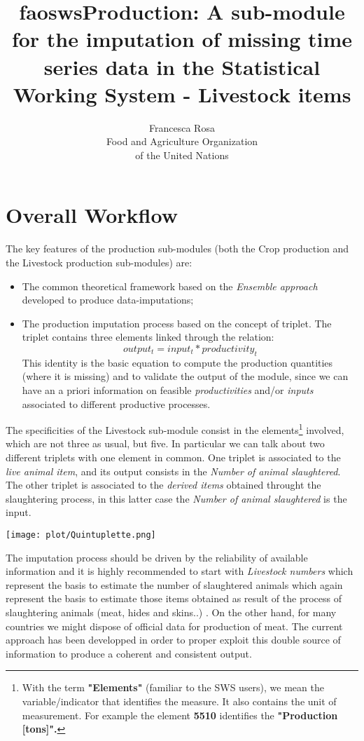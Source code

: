 \documentclass[nojss]{jss}
\title{\bf faoswsProduction: A sub-module for the imputation of missing time
series data in the Statistical Working System - Livestock items }
\author{Francesca Rosa\\ Food and Agriculture
    Organization \\ of the United Nations\\}
\begin{document}

\SwaveParseOpstions


\section{Overall Workflow}

The key features of the production sub-modules (both the Crop production and the Livestock production sub-modules) are:
\begin{itemize}
\item{The common theoretical framework based on the \textit{Ensemble approach} developed to produce data-imputations};
\item{The production imputation process based on the concept of triplet. The triplet contains three elements linked through the relation:
\begin{dmath*}
output_{t}= input_{t} * productivity_{t}
\end{dmath*}
This identity is the basic equation to compute the production quantities (where it is missing) and to validate the output of the module, since we can have an a priori information on feasible \textit{productivities} and/or \textit{inputs} associated to different productive processes.}
\end{itemize}



The specificities of the Livestock sub-module consist in the elements\footnote{With the term \textbf{"Elements"} (familiar to the SWS users), we mean the variable/indicator that identifies the measure. It also contains the unit of measurement. For example the element \textbf{5510} identifies the \textbf{"Production [tons]".}} involved, which are not three as usual, but five. In particular we can talk about two different triplets with one element in common. One triplet is associated to the \textit{live animal item}, and its output consists in the \textit{Number of animal slaughtered}. The other triplet is associated to the \textit{derived items} obtained throught the slaughtering process, in this latter case the \textit{Number of animal slaughtered} is the input. 


\begin{center}
\texttt{[image: plot/Quintuplette.png]}
\end{center}

The imputation process should be driven by the reliability of available information and it is highly recommended to start with \textit{Livestock numbers} which represent the basis to estimate the number of slaughtered animals which again represent the basis to estimate those items obtained as result of the process of slaughtering animals (meat, hides and skins..) . On the other hand, for many countries we might dispose of official data for production of meat. The current approach has been developped in order to proper exploit this double source of information to produce a coherent and consistent output.
\end{document}
